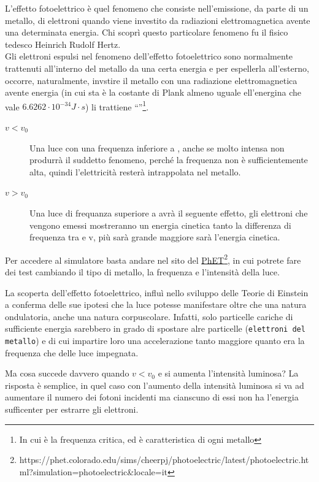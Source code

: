 \begin{defi}
  L'effetto fotoelettrico è quel fenomeno che consiste nell'emissione, da parte di un metallo, di
  elettroni quando viene investito da radiazioni elettromagnetica avente una determinata energia.
  Chi scoprì questo particolare fenomeno fu il fisico tedesco Heinrich Rudolf Hertz.\\
  Gli elettroni espulsi nel fenomeno dell'effetto fotoelettrico sono normalmente trattenuti all'interno
  del metallo da una certa energia e per espellerla all'esterno, occorre, naturalmente, invstire il
  metallo con una radiazione elettromagnetica avente energia  (in cui  sta è la costante di Plank  almeno uguale ell'energina che vale $6.6262\cdot 10^{-34}J\cdot s$)
  li trattiene ``''\footnote{In cui  è la frequenza critica, ed è caratteristica di
    ogni metallo}.
  \begin{description}
  \item[$v<v_0$] Una luce con una frequenza inferiore a , anche se molto intensa non
    produrrà il suddetto fenomeno, perché la frequenza non è sufficientemente alta, quindi l'elettricità
    resterà intrappolata nel metallo.
  \item[$v>v_0$] Una luce di frequanza superiore a  avrà il seguente effetto, gli elettroni
    che vengono emessi mostreranno un energia cinetica tanto la differenza di frequenza tra  e
    v, più sarà grande maggiore sarà l'energia cinetica.
  \end{description}
  Per accedere al simulatore basta andare nel sito del \href{https://phet.colorado.edu/sims/cheerpj/photoelectric/latest/photoelectric.html?simulation=photoelectric&locale=it}{PhET}\footnote{https://phet.colorado.edu/sims/cheerpj/photoelectric/latest/photoelectric.html?simulation=photoelectric\&locale=it}, in
  cui potrete fare dei test cambiando il tipo di metallo, la frequenza e l'intensità della luce.
\end{defi}
\begin{nota}
  La scoperta dell'effetto fotoelettrico, influì nello sviluppo delle Teorie di Einstein a conferma
  delle sue ipotesi che la luce potesse manifestare oltre che una natura ondulatoria, anche una natura
  corpuscolare. Infatti, solo particelle cariche di sufficiente energia sarebbero in grado di spostare
  alre particelle (\texttt{elettroni del metallo}) e di cui impartire loro una accelerazione tanto
  maggiore quanto era la frequenza che delle luce impegnata.
\end{nota}
Ma cosa succede davvero quando $v<v_0$ e si aumenta l'intensità luminosa? La risposta è semplice,
in quel caso con l'aumento della intensità luminosa si va ad aumentare il numero dei fotoni incidenti
ma cianscuno di essi non ha l'energia sufficenter per estrarre gli elettroni.

